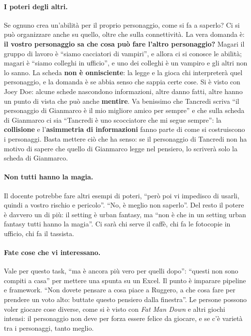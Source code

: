 \paragraph{I poteri degli altri.} Se ognuno crea un'abilità per il proprio
personaggio, come si fa a saperlo? Ci si può organizzare anche su quello, oltre che
sulla connettività. La vera domanda è: \textbf{il vostro personaggio sa che cosa può
fare l'altro personaggio?} Magari il gruppo di lavoro è ``siamo cacciatori di
vampiri'', e allora ci si conosce le abilità; magari è ``siamo colleghi in
ufficio'', e uno dei colleghi è un vampiro e gli altri non lo sanno. La scheda
\textbf{non è onnisciente}: la legge e la gioca chi interpreterà quel personaggio, e
la domanda è se abbia senso che sappia certe cose. Si è visto con Joey Doe: alcune
schede nascondono informazioni, altre danno fatti, altre hanno un punto di vista
che può anche \textbf{mentire}. Va benissimo che Tancredi scriva ``il personaggio di
Gianmarco è il mio migliore amico per sempre'' e che sulla scheda di Gianmarco ci
sia ``Tancredi è uno scocciatore che mi segue sempre'': la \textbf{collisione} e
l'\textbf{asimmetria di informazioni} fanno parte di come si costruiscono i
personaggi. Basta mettere ciò che ha senso: se il personaggio di Tancredi non ha
motivo di sapere che quello di Gianmarco legge nel pensiero, lo scriverà solo la
scheda di Gianmarco.

\paragraph{Non tutti hanno la magia.} Il docente potrebbe fare altri esempi di poteri,
``però poi vi impedisco di usarli, quindi a vostro rischio e pericolo''. ``No, è
meglio non saperlo''. Del resto il potere è davvero un di più: il setting è urban
fantasy, ma ``non è che in un setting urban fantasy tutti hanno la magia''. Ci sarà
chi serve il caffè, chi fa le fotocopie in ufficio, chi fa il tassista.

\paragraph{Fate cose che vi interessano.} Vale per questo task, ``ma è ancora più vero
per quelli dopo'': ``questi non sono compiti a casa'' per mettere una spunta su un
Excel. Il punto è imparare pipeline e framework. ``Non dovete pensare a cosa piace a
Ruggero, a che cosa fare per prendere un voto alto: buttate questo pensiero dalla
finestra''. Le persone possono voler giocare cose diverse, come si è visto con
\emph{Fat Man Down} e altri giochi intensi: il personaggio non deve per forza essere
felice da giocare, e se c'è varietà tra i personaggi, tanto meglio.

